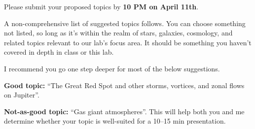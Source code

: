 \documentclass[11pt]{article}
\begin{document}
Please submit your proposed topics by \textbf{10 PM on April 11th}.

\medskip \noindent
A non-comprehensive list of suggested topics follows.  You can choose something not listed, so long as it's within the realm of stars, galaxies, cosmology, and related topics relevant to our lab's focus area. It should be something you haven't covered in depth in class or this lab.

\medskip \noindent
I recommend you go one step deeper for most of the below suggestions.

\medskip \noindent
\textbf{Good topic:} ``The Great Red Spot and other storms, vortices, and zonal flows on
Jupiter''.

\noindent
\textbf{Not-as-good topic:} ``Gas giant atmospheres''.
This will help both you and me determine whether your topic is well-suited for
a 10--15 min presentation.
\end{document}
